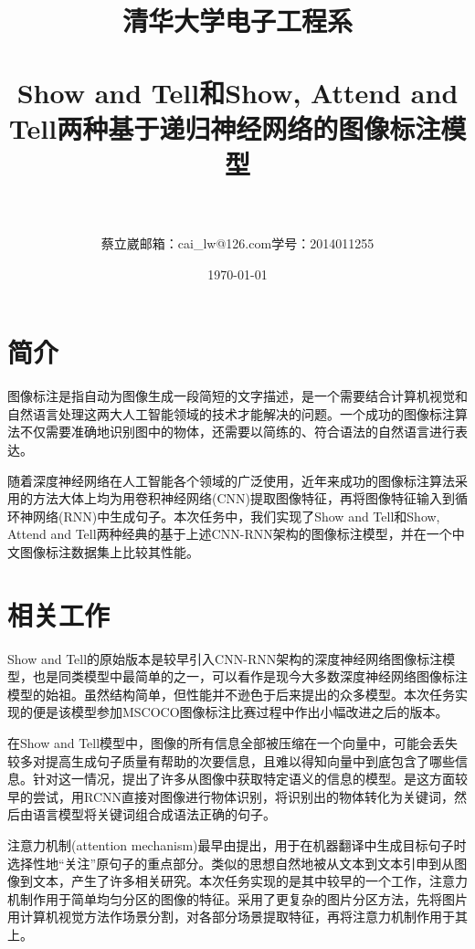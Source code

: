 \documentclass[10pt,a4paper,UTF8]{ctexart}
\title{	
	\normalfont \normalsize
	\textsc{清华大学电子工程系} \\ [25pt]
	\horrule{0.5pt} \\[0.4cm] %
	\huge Show and Tell和Show, Attend and Tell两种基于递归神经网络的图像标注模型 \\ %
	\horrule{2pt} \\[0.5cm] %
}
\author{ 蔡立崴\space 邮箱：cai\_lw@126.com\space 学号：2014011255 } %
\date{\normalsize\today} %
\begin{document}
	
	\begin{spacing}{1.5}
		\begin{titlepage}
			\maketitle %
		\end{titlepage}
		
		\newpage
		
		\section{简介}
		
		图像标注是指自动为图像生成一段简短的文字描述，是一个需要结合计算机视觉和自然语言处理这两大人工智能领域的技术才能解决的问题。一个成功的图像标注算法不仅需要准确地识别图中的物体，还需要以简练的、符合语法的自然语言进行表达。
		
		随着深度神经网络在人工智能各个领域的广泛使用，近年来成功的图像标注算法采用的方法大体上均为用卷积神经网络(CNN)提取图像特征，再将图像特征输入到循环神网络(RNN)中生成句子。本次任务中，我们实现了Show and Tell\cite{st}和Show, Attend and Tell\cite{sat}两种经典的基于上述CNN-RNN架构的图像标注模型，并在一个中文图像标注数据集上比较其性能。
		
		\section{相关工作}
		
		Show and Tell的原始版本\cite{storig}是较早引入CNN-RNN架构的深度神经网络图像标注模型，也是同类模型中最简单的之一，可以看作是现今大多数深度神经网络图像标注模型的始祖。虽然结构简单，但性能并不逊色于后来提出的众多模型。本次任务实现的\cite{st}便是该模型参加MSCOCO图像标注比赛过程中作出小幅改进之后的版本。
		
		在Show and Tell模型中，图像的所有信息全部被压缩在一个向量中，可能会丢失较多对提高生成句子质量有帮助的次要信息，且难以得知向量中到底包含了哪些信息。针对这一情况，提出了许多从图像中获取特定语义的信息的模型。\cite{karpathy}是这方面较早的尝试，用RCNN直接对图像进行物体识别，将识别出的物体转化为关键词，然后由语言模型将关键词组合成语法正确的句子。
		
		注意力机制(attention mechanism)最早由\cite{bahdanau}提出，用于在机器翻译中生成目标句子时选择性地“关注”原句子的重点部分。类似的思想自然地被从文本到文本引申到从图像到文本，产生了许多相关研究。本次任务实现的\cite{sat}是其中较早的一个工作，注意力机制作用于简单均匀分区的图像的特征。\cite{jin}采用了更复杂的图片分区方法，先将图片用计算机视觉方法作场景分割，对各部分场景提取特征，再将注意力机制作用于其上。
				

\end{spacing}
\end{document}
